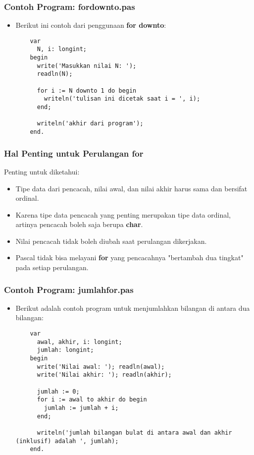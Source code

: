 \begin{frame}[fragile]
\frametitle{Contoh Program: fordownto.pas}
\begin{itemize}
  \item Berikut ini contoh dari penggunaan \textbf{for downto}:
  \begin{lstlisting}
    var
      N, i: longint;
    begin
      write('Masukkan nilai N: ');
      readln(N);

      for i := N downto 1 do begin
        writeln('tulisan ini dicetak saat i = ', i);
      end;

      writeln('akhir dari program');
    end.
  \end{lstlisting}
\end{itemize}
\end{frame}

\begin{frame}
\frametitle{Hal Penting untuk Perulangan for}
Penting untuk diketahui:
\begin{itemize}
  \item Tipe data dari pencacah, nilai awal, dan nilai akhir harus sama dan bersifat \alert{ordinal}.
  \item Karena tipe data pencacah yang penting merupakan tipe data ordinal, artinya pencacah boleh saja berupa \textbf{char}.
  \item Nilai pencacah tidak boleh diubah saat perulangan dikerjakan.
  \item Pascal tidak bisa melayani \textbf{for} yang pencacahnya "bertambah dua tingkat" pada setiap perulangan.
\end{itemize}
\end{frame}

\begin{frame}[fragile]
\frametitle{Contoh Program: jumlahfor.pas}
\begin{itemize}
  \item Berikut adalah contoh program untuk menjumlahkan bilangan di antara dua bilangan:
  \begin{lstlisting}
    var
      awal, akhir, i: longint;
      jumlah: longint;
    begin
      write('Nilai awal: '); readln(awal);
      write('Nilai akhir: '); readln(akhir);

      jumlah := 0;
      for i := awal to akhir do begin
        jumlah := jumlah + i;
      end;

      writeln('jumlah bilangan bulat di antara awal dan akhir (inklusif) adalah ', jumlah);
    end.
  \end{lstlisting}
\end{itemize}
\end{frame}

